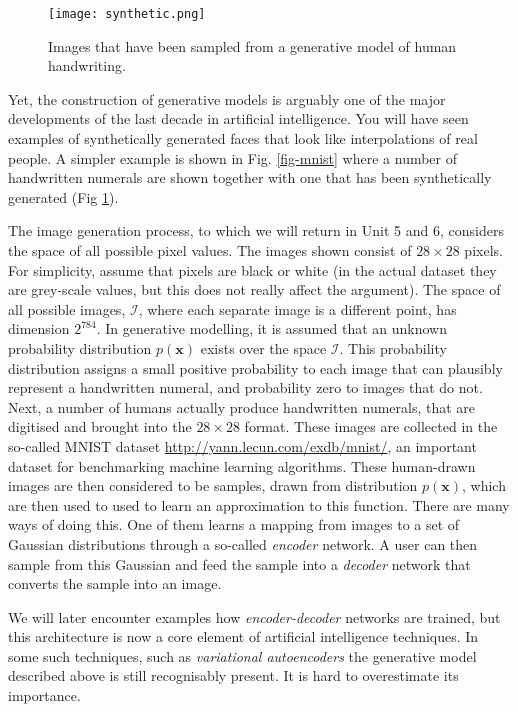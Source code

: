 \begin{figure}
  \begin{center}
   \texttt{[image: synthetic.png]}
  \end{center}
  \caption{Images that have been sampled from
  a generative model of human handwriting.}
  \label{fig-synthetic}
\end{figure}


Yet, the construction of generative models is arguably one of the major developments of the last decade in artificial intelligence. You will have seen examples of
synthetically generated faces that look like interpolations of real people. A simpler example is shown in Fig. \ref{fig-mnist} where a number of handwritten
numerals are shown together with one that has been synthetically generated (Fig \ref{fig-synthetic}).

The image generation process, to which we will return in Unit 5 and 6, considers the space of all possible pixel values. The images shown consist of $28 \times 28$
pixels. For simplicity, assume that pixels are black or white (in the actual dataset they are grey-scale values, but this does not really affect the argument). The space of
all possible images, $\mathcal{I}$, where each separate image is a different point, has dimension $2^{784}$. In generative modelling, it is assumed that an unknown
probability distribution $p(\boldsymbol{x})$ exists over the space $\mathcal{I}$. This probability distribution assigns a small positive probability
to each image that can plausibly
represent a handwritten numeral, and probability zero to images that do not. Next, a number of humans actually produce handwritten numerals, that are digitised
and brought into the $28 \times 28$ format. These images are collected in the so-called MNIST dataset \url{http://yann.lecun.com/exdb/mnist/},
an important dataset for benchmarking machine learning algorithms.
These human-drawn images are then considered to be samples, drawn from distribution $p(\boldsymbol{x})$, which are then
used to used to learn an approximation to this function. There are many ways of doing this. One of them learns a mapping from images to a set of Gaussian distributions through
a so-called \emph{encoder} network. A user can then sample from this Gaussian and feed the sample into a \emph{decoder} network that converts the sample into an image.

We will later encounter examples how \emph{encoder-decoder} networks are trained, but this architecture is now a core element of artificial intelligence techniques. In some such
techniques, such as \emph{variational autoencoders} the generative model described above is still recognisably present. It is hard to overestimate its importance.




